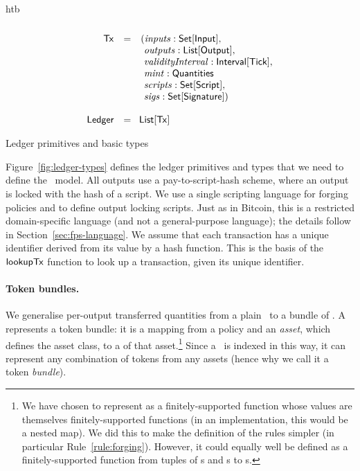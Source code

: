 \begin{ruledfigure}{htb}
\begin{displaymath}
\begin{array}{rll}
    \\
    \mathsf{Tx} &=&(\mathit{inputs}: \textsf{Set}[\textsf{Input}],\\
               & &\ \mathit{outputs}: \textsf{List}[\textsf{Output}],\\
               & &\ \mathit{validityInterval}: \textsf{Interval}[\textsf{Tick}],\\
               & &\ \mathit{mint}: \textsf{Quantities}\\
               & &\ \mathit{scripts}: \textsf{Set}[\textsf{Script}],\\
               & &\ \mathit{sigs}: \textsf{Set}[\textsf{Signature}])\\
    \\
    \textsf{Ledger} &=&\!\textsf{List}[\mathsf{Tx}]\\
    \end{array}
  \end{displaymath}
  \caption{Ledger primitives and basic types}
  \label{fig:ledger-types}
\end{ruledfigure}
%
Figure~\ref{fig:ledger-types} defines the ledger primitives and types that we need to define the \UTXOma\ model.
All outputs use a pay-to-script-hash scheme, where an output is locked with the hash of a script. We use a single scripting language for forging policies and to define output locking scripts. Just as in Bitcoin, this is a restricted domain-specific language (and not a general-purpose language); the details follow in Section~\ref{sec:fps-language}.
We assume that each transaction has a unique identifier derived from its value by a hash function. This is the basis of the $\mathsf{lookupTx}$ function to look up a transaction, given its unique identifier.

\paragraph{Token bundles.}

We generalise per-output transferred quantities from a plain \Quantity\ to a bundle of \Quantities.
A \Quantities{} represents a token bundle: it is a mapping from a policy and an \emph{asset}, which defines the asset class, to a \Quantity{} of that asset.\footnote{
  We have chosen to represent \Quantities{} as a finitely-supported function whose values are themselves finitely-supported functions (in an implementation, this would be a nested map).
  We did this to make the definition of the rules simpler (in particular Rule~\ref{rule:forging}).
  However, it could equally well be defined as a finitely-supported function from tuples of \Policy{}s and \Asset{}s to \Quantity{}s.
}
Since a \Quantities\ is indexed in this way, it can represent any combination of tokens from any assets (hence why we call it a token \emph{bundle}).

